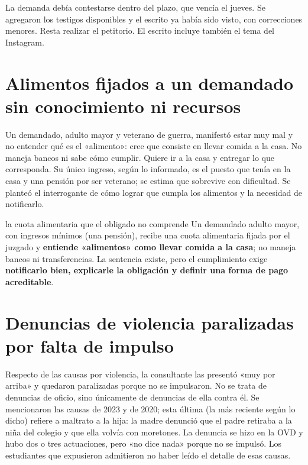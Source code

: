 \documentclass[12pt,oneside]{book}
\begin{document}
La demanda debía contestarse dentro del plazo, que vencía el jueves. Se agregaron los testigos disponibles y el escrito ya había sido visto, con correcciones menores. Resta realizar el petitorio. El escrito incluye también el tema del Instagram.

\section{Alimentos fijados a un demandado sin conocimiento ni recursos}

Un demandado, adulto mayor y veterano de guerra, manifestó estar muy mal y no entender qué es el «alimento»: cree que consiste en llevar comida a la casa. No maneja bancos ni sabe cómo cumplir. Quiere ir a la casa y entregar lo que corresponda. Su único ingreso, según lo informado, es el puesto que tenía en la casa y una pensión por ser veterano; se estima que sobrevive con dificultad. Se planteó el interrogante de cómo lograr que cumpla los alimentos y la necesidad de notificarlo.

\begin{example}{la cuota alimentaria que el obligado no comprende}
Un demandado adulto mayor, con ingresos mínimos (una pensión), recibe una cuota alimentaria fijada por el juzgado y \textbf{entiende «alimentos» como llevar comida a la casa}; no maneja bancos ni transferencias. La sentencia existe, pero el cumplimiento exige \textbf{notificarlo bien, explicarle la obligación y definir una forma de pago acreditable}.
\end{example}

\section{Denuncias de violencia paralizadas por falta de impulso}

Respecto de las causas por violencia, la consultante las presentó «muy por arriba» y quedaron paralizadas porque no se impulsaron. No se trata de denuncias de oficio, sino únicamente de denuncias de ella contra él. Se mencionaron las causas de 2023 y de 2020; esta última (la más reciente según lo dicho) refiere a maltrato a la hija: la madre denunció que el padre retiraba a la niña del colegio y que ella volvía con moretones. La denuncia se hizo en la OVD y hubo dos o tres actuaciones, pero «no dice nada» porque no se impulsó. Los estudiantes que expusieron admitieron no haber leído el detalle de esas causas.

\end{document}
